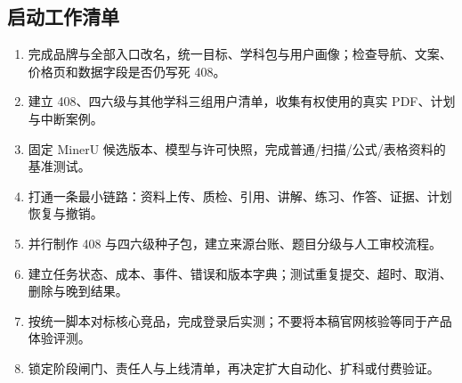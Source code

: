 \documentclass[UTF8,a4paper,11pt,fontset=none]{ctexart}
\begin{document}
\subsection{启动工作清单}
\begin{enumerate}
\item 完成品牌与全部入口改名，统一目标、学科包与用户画像；检查导航、文案、价格页和数据字段是否仍写死 408。
\item 建立 408、四六级与其他学科三组用户清单，收集有权使用的真实 PDF、计划与中断案例。
\item 固定 MinerU 候选版本、模型与许可快照，完成普通/扫描/公式/表格资料的基准测试。
\item 打通一条最小链路：资料上传、质检、引用、讲解、练习、作答、证据、计划恢复与撤销。
\item 并行制作 408 与四六级种子包，建立来源台账、题目分级与人工审校流程。
\item 建立任务状态、成本、事件、错误和版本字典；测试重复提交、超时、取消、删除与晚到结果。
\item 按统一脚本对标核心竞品，完成登录后实测；不要将本稿官网核验等同于产品体验评测。
\item 锁定阶段闸门、责任人与上线清单，再决定扩大自动化、扩科或付费验证。
\end{enumerate}
\end{document}
